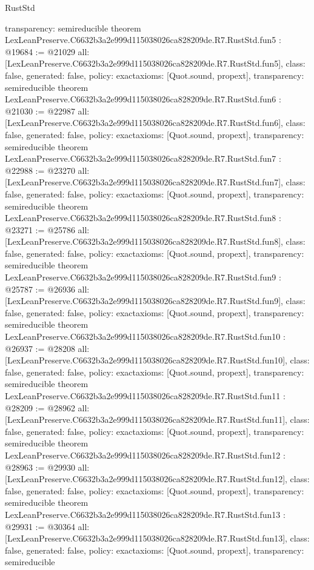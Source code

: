 \begin{lexlean}{RustStd}
\begin{coremodule}
{  transparency: semireducible
}
theorem LexLeanPreserve.C6632b3a2e999d115038026ca828209de.R7.RustStd.fun5 : @19684 := @21029 {
  all: [LexLeanPreserve.C6632b3a2e999d115038026ca828209de.R7.RustStd.fun5],
  class: false,
  generated: false,
  policy: exact{axioms: [Quot.sound, propext]},
  transparency: semireducible
}
theorem LexLeanPreserve.C6632b3a2e999d115038026ca828209de.R7.RustStd.fun6 : @21030 := @22987 {
  all: [LexLeanPreserve.C6632b3a2e999d115038026ca828209de.R7.RustStd.fun6],
  class: false,
  generated: false,
  policy: exact{axioms: [Quot.sound, propext]},
  transparency: semireducible
}
theorem LexLeanPreserve.C6632b3a2e999d115038026ca828209de.R7.RustStd.fun7 : @22988 := @23270 {
  all: [LexLeanPreserve.C6632b3a2e999d115038026ca828209de.R7.RustStd.fun7],
  class: false,
  generated: false,
  policy: exact{axioms: [Quot.sound, propext]},
  transparency: semireducible
}
theorem LexLeanPreserve.C6632b3a2e999d115038026ca828209de.R7.RustStd.fun8 : @23271 := @25786 {
  all: [LexLeanPreserve.C6632b3a2e999d115038026ca828209de.R7.RustStd.fun8],
  class: false,
  generated: false,
  policy: exact{axioms: [Quot.sound, propext]},
  transparency: semireducible
}
theorem LexLeanPreserve.C6632b3a2e999d115038026ca828209de.R7.RustStd.fun9 : @25787 := @26936 {
  all: [LexLeanPreserve.C6632b3a2e999d115038026ca828209de.R7.RustStd.fun9],
  class: false,
  generated: false,
  policy: exact{axioms: [Quot.sound, propext]},
  transparency: semireducible
}
theorem LexLeanPreserve.C6632b3a2e999d115038026ca828209de.R7.RustStd.fun10 : @26937 := @28208 {
  all: [LexLeanPreserve.C6632b3a2e999d115038026ca828209de.R7.RustStd.fun10],
  class: false,
  generated: false,
  policy: exact{axioms: [Quot.sound, propext]},
  transparency: semireducible
}
theorem LexLeanPreserve.C6632b3a2e999d115038026ca828209de.R7.RustStd.fun11 : @28209 := @28962 {
  all: [LexLeanPreserve.C6632b3a2e999d115038026ca828209de.R7.RustStd.fun11],
  class: false,
  generated: false,
  policy: exact{axioms: [Quot.sound, propext]},
  transparency: semireducible
}
theorem LexLeanPreserve.C6632b3a2e999d115038026ca828209de.R7.RustStd.fun12 : @28963 := @29930 {
  all: [LexLeanPreserve.C6632b3a2e999d115038026ca828209de.R7.RustStd.fun12],
  class: false,
  generated: false,
  policy: exact{axioms: [Quot.sound, propext]},
  transparency: semireducible
}
theorem LexLeanPreserve.C6632b3a2e999d115038026ca828209de.R7.RustStd.fun13 : @29931 := @30364 {
  all: [LexLeanPreserve.C6632b3a2e999d115038026ca828209de.R7.RustStd.fun13],
  class: false,
  generated: false,
  policy: exact{axioms: [Quot.sound, propext]},
  transparency: semireducible
}
\end{coremodule}
\end{lexlean}
